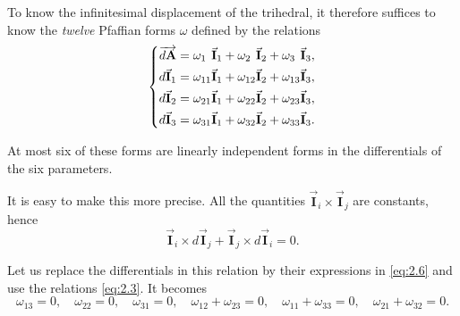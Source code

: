 \documentclass[leqno,11pt]{book}
\numberwithin{equation}{chapter}
\theoremstyle{shape1}
\theoremstyle{shapesmall}
\newcommand{\rvec}[1]{\vec{\mathbf{#1}}}
\newcommand{\ivec}{\rvec{I}}
\begin{document}
To know the infinitesimal displacement of the trihedral, it therefore suffices to know the \emph{twelve} Pfaffian forms $\omega$ defined by the relations
\begin{equation}
  \label{eq:2.6}
  \left\{
    \begin{aligned}
      \overrightarrow{d\mathbf{A}}&=\omega_{1\hphantom{0}}\ivec_{1}+\omega_{2\hphantom{0}}\ivec_{2}+\omega_{3\hphantom{0}}\ivec_{3},\\
      d\ivec_{1}&=\omega_{11}\ivec_{1}+\omega_{12}\ivec_{2}+\omega_{13}\ivec_{3},\\
      d\ivec_{2}&=\omega_{21}\ivec_{1}+\omega_{22}\ivec_{2}+\omega_{23}\ivec_{3},\\
      d\ivec_{3}&=\omega_{31}\ivec_{1}+\omega_{32}\ivec_{2}+\omega_{33}\ivec_{3}.
    \end{aligned}
  \right.
\end{equation}

At most six of these forms are linearly independent forms in the differentials of the six parameters.

It is easy to make this more precise. All the quantities $\ivec_{i}\times\ivec_{j}$ are constants, hence
\[
\ivec_{i}\times d\ivec_{j}+\ivec_{j}\times d\ivec_{i}=0.
\]

Let us replace the differentials in this relation by their expressions in \eqref{eq:2.6} and use the relations \eqref{eq:2.3}. It becomes
\[
\omega_{13}=0,\quad\omega_{22}=0,\quad\omega_{31}=0,\quad\omega_{12}+\omega_{23}=0,\quad\omega_{11}+\omega_{33}=0,\quad\omega_{21}+\omega_{32}=0.
\]
\end{document}
